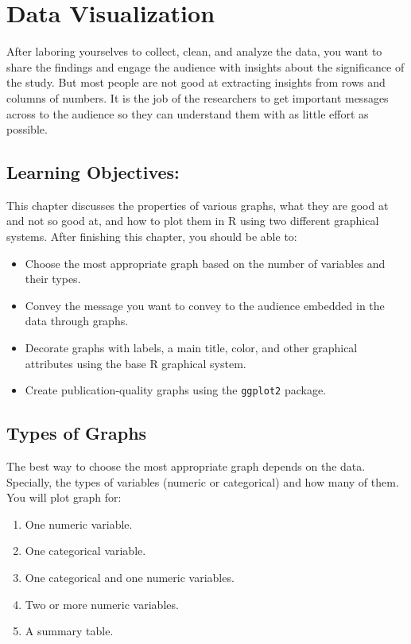 \documentclass[
  letterpaper,
]{book}
\begin{document}

\chapter{Data Visualization}\label{data-visualization}

After laboring yourselves to collect, clean, and analyze the data, you
want to share the findings and engage the audience with insights about
the significance of the study. But most people are not good at
extracting insights from rows and columns of numbers. It is the job of
the researchers to get important messages across to the audience so they
can understand them with as little effort as possible.

\section*{Learning Objectives:}\label{learning-objectives-2}


This chapter discusses the properties of various graphs, what they are
good at and not so good at, and how to plot them in R using two
different graphical systems. After finishing this chapter, you should be
able to:

\begin{itemize}
\item
  Choose the most appropriate graph based on the number of variables and
  their types.
\item
  Convey the message you want to convey to the audience embedded in the
  data through graphs.
\item
  Decorate graphs with labels, a main title, color, and other graphical
  attributes using the base R graphical system.
\item
  Create publication-quality graphs using the \texttt{ggplot2} package.
\end{itemize}

\section{Types of Graphs}\label{types-of-graphs}

The best way to choose the most appropriate graph depends on the data.
Specially, the types of variables (numeric or categorical) and how many
of them. You will plot graph for:

\begin{enumerate}
\def\labelenumi{\arabic{enumi}.}
\item
  One numeric variable.
\item
  One categorical variable.
\item
  One categorical and one numeric variables.
\item
  Two or more numeric variables.
\item
  A summary table.
\end{enumerate}
\end{document}
